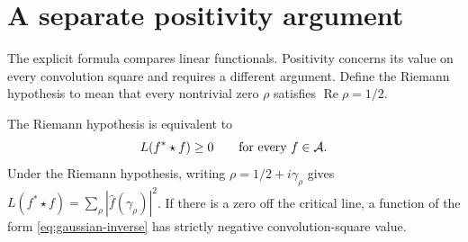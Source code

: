 \section{A separate positivity argument}
\label{sec:positivity}

The explicit formula compares linear functionals.
Positivity concerns its value on every convolution square and requires a
different argument.  Define the Riemann hypothesis to mean that every
nontrivial zero $\rho$ satisfies $\operatorname{Re}\rho=1/2$.

\begin{theorem}
\label{thm:positivity}
The Riemann hypothesis is equivalent to
\begin{equation}
 L(f^*\star f)\geq0\qquad\text{for every }f\in\mathcal A.
 \label{eq:positivity}
\end{equation}
Under the Riemann hypothesis, writing $\rho=1/2+i\gamma_\rho$ gives
$L(f^*\star f)=\sum_\rho|\widehat f(\gamma_\rho)|^2$.
If there is a zero off the critical line, a function of the form
\eqref{eq:gaussian-inverse} has strictly negative convolution-square value.
\end{theorem}

